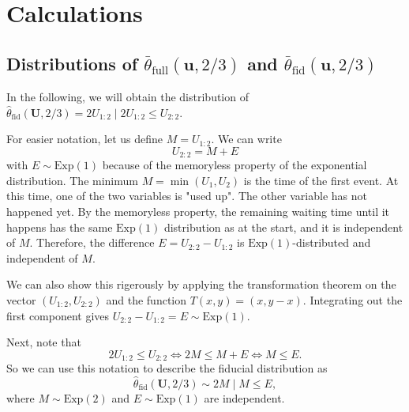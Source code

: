 \newpage
\section*{Calculations}

\subsection{Distributions of $\bar \theta_{\text{full}}(\mathbf u, 2 / 3)$ and $\bar \theta_{\text{fid}}(\mathbf u, 2 / 3)$}



In the following, we will obtain the distribution of $\hat \theta_{\text{fid}} (\mathbf U, 2/3) = 2 U_{1:2} \; | \; 2 U_{1:2} \leq U_{2:2}$. 


For easier notation, let us define $M = U_{1:2}$.
We can write
\[
U_{2:2} = M + E
\]
with $E \sim \text{Exp}(1)$ because of the memoryless property of the exponential distribution.
The minimum $M = \min(U_1, U_2)$ is the time of the first event. 
At this time, one of the two variables is "used up". 
The other variable has not happened yet. 
By the memoryless property, the remaining waiting time until it happens has the same $\text{Exp}(1)$ distribution as at the start, and it is independent of $M$.
Therefore, the difference $E = U_{2:2} - U_{1:2}$ is $\text{Exp}(1)$-distributed and independent of $M$.

We can also show this rigerously by applying the transformation theorem on the vector $(U_{1:2}, U_{2:2})$ and the function $T(x,y) = (x, y-x)$.
Integrating out the first component gives $U_{2:2} - U_{1:2} = E \sim \text{Exp}(1)$.

Next, note that
\[
2 U_{1:2} \leq U_{2:2}
\iff 2M \leq M + E
\iff M \leq E.
\]
So we can use this notation to describe the fiducial distribution as
\[
\hat{\theta}_{\text{fid}}(\mathbf{U}, 2/3) \sim 2M \;\big|\; M \leq E,
\]
where $M \sim \text{Exp}(2)$ and $E \sim \text{Exp}(1)$ are independent.



